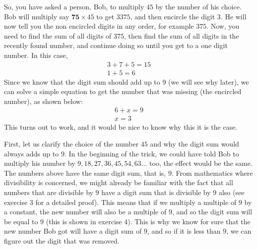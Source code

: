 So, you have asked a person, Bob, to multiply $45$ by the number of his choice. Bob will multiply say $\textbf{75}\times45$ to get $3375$, and then encircle the digit $3$. He will now tell you the non encircled digits in any order, for example $375$. Now, you need to find the sum of all digits of $375$, then find the sum of all digits in the recently found number, and continue doing so until you get to a one digit number. In this case, 
\begin{eqnarray*}
3+7+5 = 15\\
1+5=6
\end{eqnarray*}
Since we know that the digit sum should add up to $9$ (we will see why later), we can solve a simple equation to get the number that was missing (the encircled number), as shown below:
\begin{eqnarray*}
6+x=9\\
x=3
\end{eqnarray*}
This turns out to work, and it would be nice to know why this it is the case.

First, let us clarify the choice of the number $45$ and why the digit sum would always adds up to $9$. In the beginning of the trick, we could have told Bob to multiply his number by $9,18,27,36,45,54,63\dots$ too, the effect would be the same. The numbers above have the same digit sum, that is, $9$. From mathematics where divisibility is concerned, we might already be familiar with the fact that all numbers that are divisible by $9$ have a digit sum that is divisible by $9$ also (see exercise 3 for a detailed proof). This means that if we multiply a multiple of $9$ by a constant, the new number will also be a multiple of $9$, and so the digit sum will be equal to $9$ (this is shown in exercise 4). This is why we know for sure that the new number Bob got will have a digit sum of $9$, and so if it is less than $9$, we can figure out the digit that was removed.

